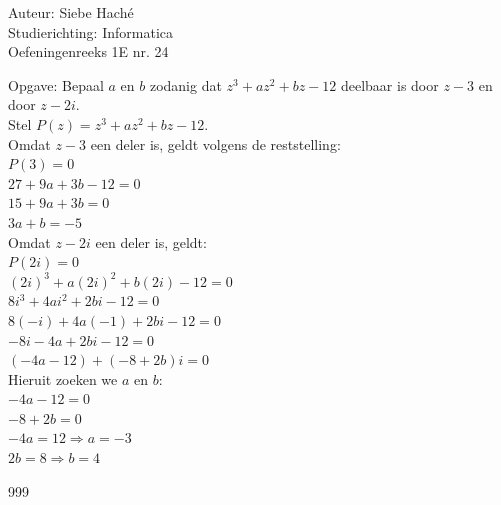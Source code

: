\documentclass[a4paper]{article}
\begin{document}
\noindent \large Auteur: Siebe Haché \\
\noindent \large Studierichting: Informatica\\
\noindent \large Oefeningenreeks 1E nr. 24\\

\medskip
\normalsize

Opgave: Bepaal $a$ en $b$ zodanig dat $z^3 + az^2 + bz - 12$ deelbaar is door $z - 3$ en door $z - 2i$.\\

Stel $P(z) = z^3 + az^2 + bz - 12$.\\

Omdat $z - 3$ een deler is, geldt volgens de reststelling: \\

$P(3) = 0$ \\

$27 + 9a + 3b - 12 = 0$\\

$15 + 9a + 3b = 0$ \\

$3a + b = -5$\\

Omdat $z - 2i$ een deler is, geldt: \\

$P(2i) = 0$ \\

$(2i)^3 + a(2i)^2 + b(2i) - 12 = 0$\\

$8i^3 + 4ai^2 + 2bi - 12 = 0$ \\

$8(-i) + 4a(-1) + 2bi - 12 = 0$ \\

$-8i - 4a + 2bi - 12 = 0$\\

$(-4a - 12) + (-8 + 2b)i = 0$ \\

Hieruit zoeken we $a$ en $b$: \\

$-4a - 12 = 0$\\

$-8 + 2b = 0$\\

$-4a = 12 \Rightarrow a = -3$\\

$2b = 8 \Rightarrow b = 4$\\

\begin{thebibliography}{999}
\end{thebibliography}
\end{document}
